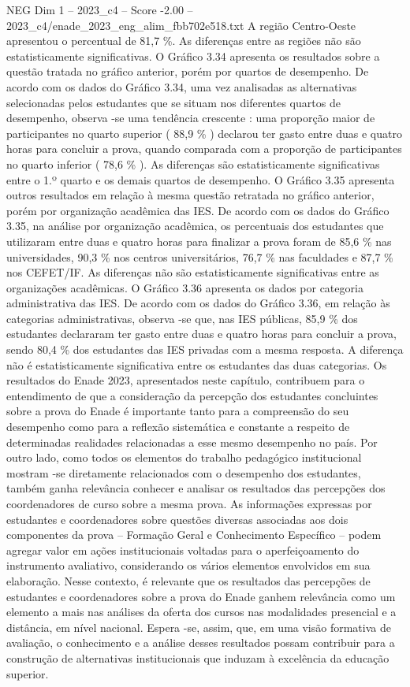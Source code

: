 \begin{textsample}{NEG Dim 1 – 2023\_c4 – Score -2.00 – 2023\_c4/enade\_2023\_eng\_alim\_fbb702e518.txt}
A região Centro-Oeste apresentou o percentual de 81,7 \%.
As diferenças entre as regiões não são estatisticamente significativas.
O Gráfico 3.34 apresenta os resultados sobre a questão tratada no gráfico anterior, porém por quartos de desempenho.
De acordo com os dados do Gráfico 3.34, uma vez analisadas as alternativas selecionadas pelos estudantes que se situam nos diferentes quartos de desempenho, observa -se uma tendência crescente : uma proporção maior de participantes no quarto superior ( 88,9 \% ) declarou ter gasto entre duas e quatro horas para concluir a prova, quando comparada com a proporção de participantes no quarto inferior ( 78,6 \% ).
As diferenças são estatisticamente significativas entre o 1.º quarto e os demais quartos de desempenho.
O Gráfico 3.35 apresenta outros resultados em relação à mesma questão retratada no gráfico anterior, porém por organização acadêmica das IES.
De acordo com os dados do Gráfico 3.35, na análise por organização acadêmica, os percentuais dos estudantes que utilizaram entre duas e quatro horas para finalizar a prova foram de 85,6 \% nas universidades, 90,3 \% nos centros universitários, 76,7 \% nas faculdades e 87,7 \% nos CEFET/IF.
As diferenças não são estatisticamente significativas entre as organizações acadêmicas.
O Gráfico 3.36 apresenta os dados por categoria administrativa das IES.
De acordo com os dados do Gráfico 3.36, em relação às categorias administrativas, observa -se que, nas IES públicas, 85,9 \% dos estudantes declararam ter gasto entre duas e quatro horas para concluir a prova, sendo 80,4 \% dos estudantes das IES privadas com a mesma resposta.
A diferença não é estatisticamente significativa entre os estudantes das duas categorias.
Os resultados do Enade 2023, apresentados neste capítulo, contribuem para o entendimento de que a consideração da percepção dos estudantes concluintes sobre a prova do Enade é importante tanto para a compreensão do seu desempenho como para a reflexão sistemática e constante a respeito de determinadas realidades relacionadas a esse mesmo desempenho no país.
Por outro lado, como todos os elementos do trabalho pedagógico institucional mostram -se diretamente relacionados com o desempenho dos estudantes, também ganha relevância conhecer e analisar os resultados das percepções dos coordenadores de curso sobre a mesma prova.
As informações expressas por estudantes e coordenadores sobre questões diversas associadas aos dois componentes da prova – Formação Geral e Conhecimento Específico – podem agregar valor em ações institucionais voltadas para o aperfeiçoamento do instrumento avaliativo, considerando os vários elementos envolvidos em sua elaboração.
Nesse contexto, é relevante que os resultados das percepções de estudantes e coordenadores sobre a prova do Enade ganhem relevância como um elemento a mais nas análises da oferta dos cursos nas modalidades presencial e a distância, em nível nacional.
Espera -se, assim, que, em uma visão formativa de avaliação, o conhecimento e a análise desses resultados possam contribuir para a construção de alternativas institucionais que induzam à excelência da educação superior.

\end{textsample}
